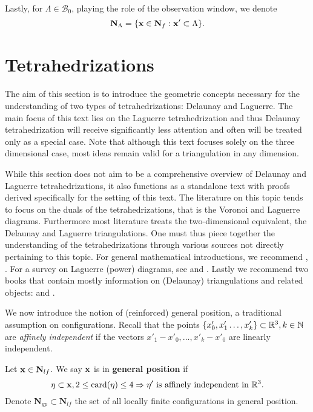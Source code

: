 Lastly, for $\Lambda \in \mathcal B_0$, playing the role of the observation window, we denote 
$$\mathbf N_\Lambda = \{ {\mathbf{x}} \in \mathbf N_{f}: {\mathbf{x}}'\subset \Lambda\}.$$

\section{Tetrahedrizations}\label{sec:tetrahedrizations}
The aim of this section is to introduce the geometric concepts necessary for the understanding of two types of tetrahedrizations: Delaunay and Laguerre. The main focus of this text lies on the Laguerre tetrahedrization and thus Delaunay tetrahedrization will receive significantly less attention and often will be treated only as a special case. Note that although this text focuses solely on the three dimensional case, most ideas remain valid for a triangulation in any dimension.

While this section does not aim to be a comprehensive overview of Delaunay and Laguerre tetrahedrizations, it also functions as a standalone text with proofs derived specifically for the setting of this text. The literature on this topic tends to focus on the duals of the tetrahedrizations, that is the Voronoi and Laguerre diagrams. Furthermore most literature treats the two-dimensional equivalent, the Delaunay and Laguerre triangulations. One must thus piece together the understanding of the tetrahedrizations through various sources not directly pertaining to this topic. For general mathematical introductions, we recommend \cite{Okabe1992}, \cite{Gavrilova}. For a survey on Laguerre (power) diagrams, see \cite{Aurenhammer1987} and \cite{Hummel}. Lastly we recommend two books that contain mostly information on (Delaunay) triangulations and related objects: \cite{Delorea2010} and \cite{Aurenhammer2013}. \newline

\noindent We now introduce the notion of (reinforced) general position, a traditional assumption on configurations. Recall that the points $\{x'_0,x'_1\dots, x'_k\}\subset {\mathbb R^3}, k\in \mathbb N$ are \textit{affinely independent} if the vectors $x'_1-x'_0,\dots, x'_k-x'_0$ are linearly independent.

\begin{definition}
Let ${\mathbf{x}} \in \mathbf N_{lf}$. We say ${\mathbf{x}}$ is in \textbf{general position} if 
$$ \eta \subset {\mathbf{x}}, 2 \leq \mathrm{card}(\eta) \leq 4 \Rightarrow \eta' \text{ is affinely independent in } {\mathbb R^3}. $$   
Denote $\mathbf N_{gp}\subset \mathbf N_{lf}$ the set of all locally finite configurations in general position.
\end{definition}

